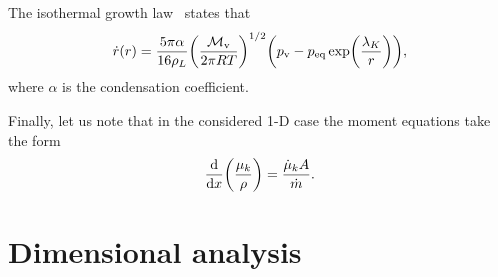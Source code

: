 \documentclass{article}
\newcommand{\vap}{\text{v}}
\newcommand{\eq}{\text{eq}}
\begin{document}
The isothermal growth law~\cite{sinha2009modeling} states that
\begin{equation}\label{eq:dotr}
    \dot{r}(r) = \frac{5\pi\alpha}{16\rho_L}
        \qty(\frac{\mathcal{M}_\vap}{2\pi RT})^{1/2} \qty(p_\vap-p_\eq\exp(\frac{\lambda_K}{r})),
\end{equation}
where $\alpha$ is the condensation coefficient.

Finally, let us note that in the considered 1-D case the moment equations take the form
\begin{equation}\label{eq:moments}
    \dv{x}(\frac{\mu_k}{\rho}) = \frac{\dot{\mu}_kA}{\dot{m}}.
\end{equation}

\section{Dimensional analysis}
\end{document}
